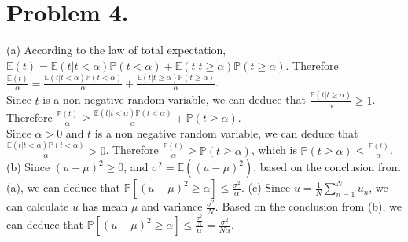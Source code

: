 \documentclass{article}
\begin{document}
    \section*{Problem 4.}
    (a) According to the law of total expectation, $\mathbb{E}(t) = \mathbb{E}(t|t<\alpha) \mathbb{P}(t<\alpha) +
    \mathbb{E}(t|t \geq \alpha) \mathbb{P}(t \geq \alpha)$. Therefore $\frac{\mathbb{E}(t)}{\alpha} = 
    \frac{\mathbb{E}(t|t<\alpha) \mathbb{P}(t<\alpha)}{\alpha} + 
    \frac{\mathbb{E}(t|t \geq \alpha) \mathbb{P}(t \geq \alpha)}{\alpha}$.\\
    Since $t$ is a non negative random variable, we can deduce that 
    $\frac{\mathbb{E}(t|t \geq \alpha)}{\alpha} \geq 1$. Therefore $\frac{\mathbb{E}(t)}{\alpha} \geq 
    \frac{\mathbb{E}(t|t<\alpha) \mathbb{P}(t<\alpha)}{\alpha} + \mathbb{P}(t \geq \alpha)$.\\
    Since $\alpha > 0$ and $t$ is a non negative random variable, we can deduce that 
    $\frac{\mathbb{E}(t|t<\alpha) \mathbb{P}(t<\alpha)}{\alpha} > 0$. Therefore $\frac{\mathbb{E}(t)}{\alpha} \geq 
    \mathbb{P}(t \geq \alpha)$, which is $\mathbb{P}(t \geq \alpha) \leq \frac{\mathbb{E}(t)}{\alpha}$.\\
    (b) Since $(u - \mu)^2 \geq 0$, and $\sigma^2 = \mathbb{E}((u - \mu)^2)$, based on the conclusion from (a), we 
    can deduce that $\mathbb{P}[(u - \mu)^2 \geq \alpha] \leq \frac{\sigma^2}{\alpha}$.
    (c) Since $u = \frac{1}{N}\sum_{n=1}^N u_n$, we can calculate $u$ has mean $\mu$ and variance 
    $\frac{\sigma^2}{N}$. Based on the conclusion from (b), we can deduce that $\mathbb{P}[(u - \mu)^2 \geq \alpha] 
    \leq \frac{\frac{\sigma^2}{N}}{\alpha} = \frac{\sigma^2}{N \alpha}$.
\end{document}
